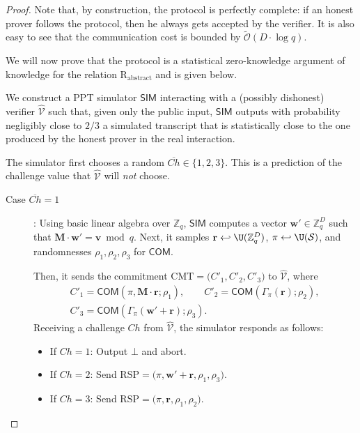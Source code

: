 \begin{proof}
  Note that, by construction, the protocol is perfectly complete: if an honest prover follows the protocol, then he always gets accepted by the verifier. It is also easy to see that the communication cost is bounded by $\widetilde{\mathcal{O}}(D \cdot \log q)$.


  We will now prove that the protocol is a statistical zero-knowledge argument of knowledge for the relation $\mathrm{R_{abstract}}$ and is given below.

  \smallskip
   We construct a \textsf{PPT} simulator $\mathsf{SIM}$ interacting with a (possibly dishonest) verifier $\widehat{\mathcal{V}}$ such that, given only the public input, $\mathsf{SIM}$ outputs with probability negligibly close to $2/3$ a simulated transcript that is statistically close to the one produced by the honest prover in the real interaction.

  The simulator first chooses a random $\overline{Ch} \in \{1,2,3\}$. This is a prediction of the challenge value that $\widehat{\mathcal{V}}$ will \emph{not} choose.
  \smallskip

  \begin{description}
    \item[\textsf{Case} $\overline{Ch}=1$]: Using basic linear algebra over $\mathbb{Z}_q$, $\mathsf{SIM}$ computes a vector $\mathbf{w}' \in \mathbb{Z}_q^D$ such that $\mathbf{M}\cdot \mathbf{w}' = \mathbf{v} \bmod q.$
      Next, it samples $\mathbf{r} \hookleftarrow \U(\mathbb{Z}_q^D)$, $\pi \hookleftarrow  \U(\mathcal{S})$, and randomnesses $\rho_1, \rho_2, \rho_3$ for $\mathsf{COM}$.

      Then, it sends the commitment $\mathrm{CMT}= \big(C'_1, C'_2, C'_3\big)$ to $\widehat{\mathcal{V}}$, where
      \begin{gather*}
        C'_1 =  \mathsf{COM}(\pi, \mathbf{M}\cdot \mathbf{r}; \rho_1), \qquad
        C'_2 =  \mathsf{COM}(\Gamma_{\pi}(\mathbf{r}); \rho_2), \\
        C'_3 =  \mathsf{COM}(\Gamma_{\pi}(\mathbf{w}' + \mathbf{r}); \rho_3).
      \end{gather*}
      Receiving a challenge $Ch$ from $\widehat{\mathcal{V}}$, the simulator responds as follows:
      \begin{itemize}
        \item If $Ch=1$: Output $\bot$ and abort.
        \item If $Ch=2$: Send $\mathrm{RSP} = \big(\pi, \mathbf{w}' + \mathbf{r}, \rho_1, \rho_3 \big)$.
        \item If $Ch=3$: Send $\mathrm{RSP} = \big(\pi, \mathbf{r}, \rho_1, \rho_2\big)$.
      \end{itemize}



\end{description}
\end{proof}
